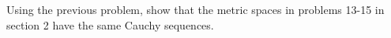 Using the previous problem, show that the metric spaces in problems 13-15 in section 2 have the same
Cauchy sequences.\\